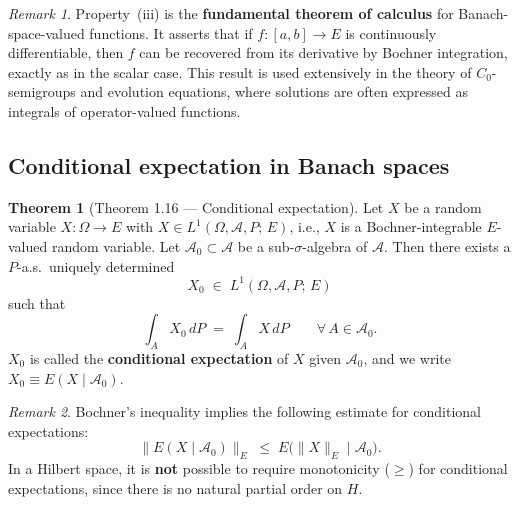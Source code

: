 \documentclass[11pt]{article}
\theoremstyle{definition}
\newtheorem{theorem}{Theorem}
\theoremstyle{remark}
\newtheorem{remark}{Remark}
\begin{document}
\begin{remark}
Property~(iii) is the \textbf{fundamental theorem of calculus} for Banach-space-valued functions.  It asserts that if $f \colon [a,b] \to E$ is continuously differentiable, then $f$ can be recovered from its derivative by Bochner integration, exactly as in the scalar case.  This result is used extensively in the theory of $C_0$-semigroups and evolution equations, where solutions are often expressed as integrals of operator-valued functions.
\end{remark}

\subsection*{Conditional expectation in Banach spaces}


\begin{theorem}[Theorem 1.16 --- Conditional expectation]
Let $X$ be a random variable $X \colon \Omega \to E$
with $X \in L^1(\Omega, \mathcal{A}, P;\, E)$,
i.e., $X$ is a Bochner-integrable $E$-valued random variable.
Let $\mathcal{A}_0 \subset \mathcal{A}$ be a sub-$\sigma$-algebra of
$\mathcal{A}$.  Then there exists a $P$-a.s.\ uniquely determined
\[
    X_0 \;\in\; L^1(\Omega, \mathcal{A}, P;\, E)
\]
such that
\[
    \int_A X_0\,dP
    \;=\;
    \int_A X\,dP
    \qquad
    \forall\, A \in \mathcal{A}_0.
\]
$X_0$ is called the \textbf{conditional expectation} of $X$ given
$\mathcal{A}_0$, and we write
$X_0 \equiv E(X \mid \mathcal{A}_0)$.
\end{theorem}

\begin{remark}
Bochner's inequality implies the following estimate for
conditional expectations:
\[
    \bigl\|E(X \mid \mathcal{A}_0)\bigr\|_E
    \;\le\;
    E\!\bigl(\|X\|_E \;\big|\; \mathcal{A}_0\bigr).
\]
In a Hilbert space, it is \textbf{not} possible to require
monotonicity ($\ge$) for conditional expectations,
since there is no natural partial order on $H$.
\end{remark}
\end{document}
